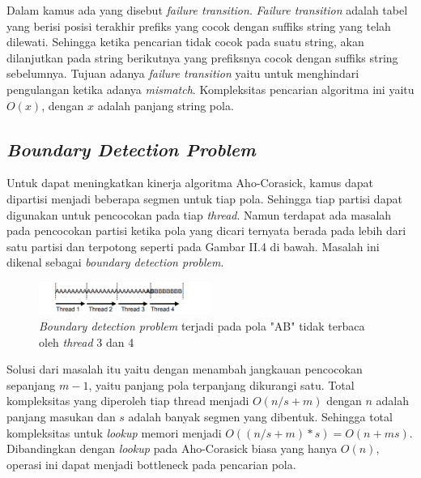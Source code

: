 
    Dalam kamus ada yang disebut \emph{failure transition}. \emph{Failure transition} adalah tabel yang berisi posisi terakhir prefiks yang cocok dengan suffiks string yang telah dilewati. Sehingga ketika pencarian tidak cocok pada suatu string, akan dilanjutkan pada string berikutnya yang prefiksnya cocok dengan suffiks string sebelumnya. Tujuan adanya \emph{failure transition} yaitu untuk menghindari pengulangan ketika adanya \emph{mismatch}. Kompleksitas pencarian algoritma ini yaitu $O(x)$, dengan $x$ adalah panjang string pola.
    
    \subsection {\emph{Boundary Detection Problem}}
    
    Untuk dapat meningkatkan kinerja algoritma Aho-Corasick, kamus dapat dipartisi menjadi beberapa segmen untuk tiap pola. Sehingga tiap partisi dapat digunakan untuk pencocokan pada tiap \emph{thread}. Namun terdapat ada masalah pada pencocokan partisi ketika pola yang dicari ternyata berada pada lebih dari satu partisi dan terpotong seperti pada Gambar II.4 di bawah. Masalah ini dikenal sebagai \emph{boundary detection problem}. 
    
    \begin{figure}[htb]
      \centering
      \includegraphics[width=0.5\textwidth]{resources/boundary.png}
      \caption[\emph{Boundary detection problem} terjadi pada pola "AB" tidak terbaca oleh \emph{thread} 3 dan 4]{\emph{Boundary detection problem} terjadi pada pola "AB" tidak terbaca oleh \emph{thread} 3 dan 4 \citep{lin2013}}
    \end{figure}
    
    Solusi dari masalah itu yaitu dengan menambah jangkauan pencocokan sepanjang $m - 1$, yaitu panjang pola terpanjang dikurangi satu. Total kompleksitas yang diperoleh tiap thread menjadi $O(n/s + m)$ dengan $n$ adalah panjang masukan dan $s$ adalah banyak segmen yang dibentuk. Sehingga total kompleksitas untuk \emph{lookup} memori menjadi $O((n/s + m) * s) = O(n + ms)$. Dibandingkan dengan \emph{lookup} pada Aho-Corasick biasa yang hanya $O(n)$, operasi ini dapat menjadi bottleneck pada pencarian pola.
    
